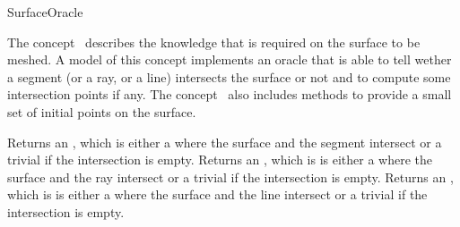 

\begin{ccRefConcept}{SurfaceOracle}


\ccDefinition
  
The concept \ccRefName\ describes the knowledge that is required on the
surface to be meshed. A model of this concept
implements an oracle that is able to tell wether a segment
(or a ray,  or a line) intersects the surface or not
and to compute some intersection
points if any. The concept \ccRefName\ also includes methods  to provide
a small set of initial points on the surface.


\ccTypes




{}  %



\ccOperations


{ Returns an ,  which is either a  where
the surface and the segment  intersect or
a trivial  if the intersection is empty.}
\ccGlue
{}
{ Returns an ,  which is is either a  where
the surface and the ray  intersect or
a trivial  if the intersection is empty.}
\ccGlue
{}
{ Returns an ,  which is is either a  where
 the surface and the line  intersect or
a trivial  if the intersection is empty.}


\end{ccRefConcept}
